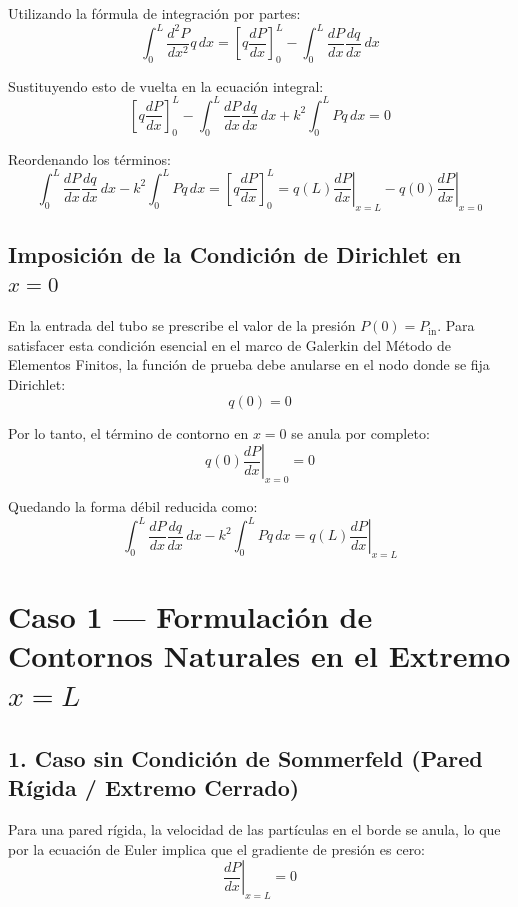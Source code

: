 \documentclass[11pt,letterpaper]{article}
\begin{document}
Utilizando la fórmula de integración por partes:
\begin{equation}
    \int_0^L \frac{d^2 P}{dx^2} q \, dx = \left[ q \frac{dP}{dx} \right]_0^L - \int_0^L \frac{dP}{dx} \frac{dq}{dx} \, dx
\end{equation}

Sustituyendo esto de vuelta en la ecuación integral:
\begin{equation}
    \left[ q \frac{dP}{dx} \right]_0^L - \int_0^L \frac{dP}{dx} \frac{dq}{dx} \, dx + k^2 \int_0^L P q \, dx = 0
\end{equation}

Reordenando los términos:
\begin{equation}
    \int_0^L \frac{dP}{dx} \frac{dq}{dx} \, dx - k^2 \int_0^L P q \, dx = \left[ q \frac{dP}{dx} \right]_0^L = q(L)\left.\frac{dP}{dx}\right|_{x=L} - q(0)\left.\frac{dP}{dx}\right|_{x=0}
\end{equation}

\subsection{Imposición de la Condición de Dirichlet en $x = 0$}
En la entrada del tubo se prescribe el valor de la presión $P(0) = P_{\text{in}}$. Para satisfacer esta condición esencial en el marco de Galerkin del Método de Elementos Finitos, la función de prueba debe anularse en el nodo donde se fija Dirichlet:
\begin{equation}
    q(0) = 0
\end{equation}

Por lo tanto, el término de contorno en $x = 0$ se anula por completo:
\begin{equation}
    q(0)\left.\frac{dP}{dx}\right|_{x=0} = 0
\end{equation}

Quedando la forma débil reducida como:
\begin{equation}
    \int_0^L \frac{dP}{dx} \frac{dq}{dx} \, dx - k^2 \int_0^L P q \, dx = q(L) \left. \frac{dP}{dx} \right|_{x=L}
\end{equation}

\section{Caso 1 --- Formulación de Contornos Naturales en el Extremo $x = L$}

\subsection{1. Caso sin Condición de Sommerfeld (Pared Rígida / Extremo Cerrado)}
Para una pared rígida, la velocidad de las partículas en el borde se anula, lo que por la ecuación de Euler implica que el gradiente de presión es cero:
\begin{equation}
    \left. \frac{dP}{dx} \right|_{x=L} = 0
\end{equation}
\end{document}
